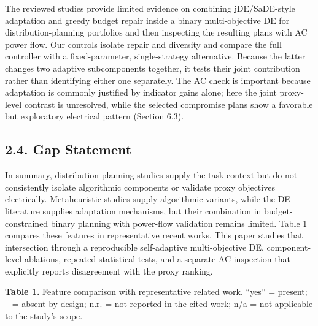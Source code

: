 \documentclass[
  10pt,
  a4paper,
]{article}
\begin{document}
The reviewed studies provide limited evidence on combining
jDE/SaDE-style adaptation and greedy budget repair inside a binary
multi-objective DE for distribution-planning portfolios and then
inspecting the resulting plans with AC power flow. Our controls isolate
repair and diversity and compare the full controller with a
fixed-parameter, single-strategy alternative. Because the latter changes
two adaptive subcomponents together, it tests their joint contribution
rather than identifying either one separately. The AC check is important
because adaptation is commonly justified by indicator gains alone; here
the joint proxy-level contrast is unresolved, while the selected
compromise plans show a favorable but exploratory electrical pattern
(Section 6.3).

\subsection{2.4. Gap Statement}\label{gap-statement}

In summary, distribution-planning studies supply the task context but do
not consistently isolate algorithmic components or validate proxy
objectives electrically. Metaheuristic studies supply algorithmic
variants, while the DE literature supplies adaptation mechanisms, but
their combination in budget-constrained binary planning with power-flow
validation remains limited. Table 1 compares these features in
representative recent works. This paper studies that intersection
through a reproducible self-adaptive multi-objective DE, component-level
ablations, repeated statistical tests, and a separate AC inspection that
explicitly reports disagreement with the proxy ranking.

\textbf{Table 1.} Feature comparison with representative related work.
``yes'' = present; -- = absent by design; n.r. = not reported in the
cited work; n/a = not applicable to the study's scope.
\end{document}
